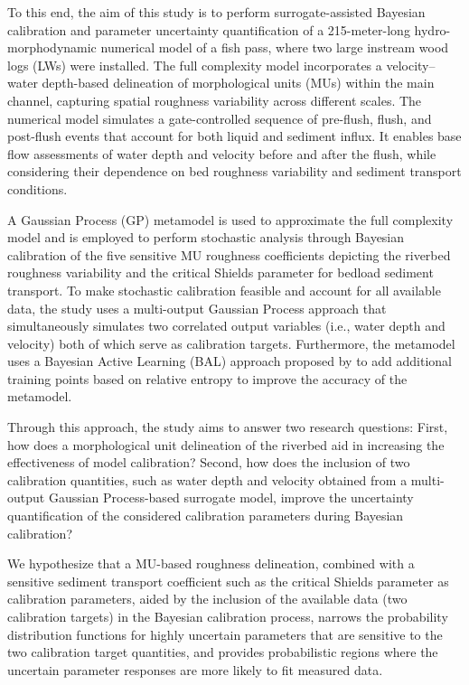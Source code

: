 \documentclass[draft,linenumbers,onecolumn]{agujournal2019} %
\begin{document}
% 
To this end, the aim of this study is to perform surrogate-assisted Bayesian calibration and parameter uncertainty quantification of a 215-meter-long hydro-morphodynamic numerical model of a fish pass, where two large instream wood logs (LWs) were installed. The full complexity model incorporates a velocity–water depth-based delineation of morphological units (MUs) within the main channel, capturing spatial roughness variability across different scales. The numerical model simulates a gate-controlled sequence of pre-flush, flush, and post-flush events that account for both liquid and sediment influx. It enables base flow assessments of water depth and velocity before and after the flush, while considering their dependence on bed roughness variability and sediment transport conditions.

A Gaussian Process (GP) metamodel is used to approximate the full complexity model and is employed to perform stochastic analysis through Bayesian calibration of the five sensitive MU roughness coefficients depicting the riverbed roughness variability and the critical Shields parameter for bedload sediment transport. To make stochastic calibration feasible and account for all available data, the study uses a multi-output Gaussian Process approach that simultaneously simulates two correlated output variables (i.e., water depth and velocity) both of which serve as calibration targets. Furthermore, the metamodel uses a Bayesian Active Learning (BAL) approach proposed by  to add additional training points based on relative entropy to improve the accuracy of the metamodel. 

Through this approach, the study aims to answer two research questions: First, how does a morphological unit delineation of the riverbed aid in increasing the effectiveness of model calibration? Second, how does the inclusion of two calibration quantities, such as water depth and velocity obtained from a multi-output Gaussian Process-based surrogate model, improve the uncertainty quantification of the considered calibration parameters during Bayesian calibration?

We hypothesize that a MU-based roughness delineation, combined with a sensitive sediment transport coefficient such as the critical Shields parameter as calibration parameters, aided by the inclusion of the available data (two calibration targets) in the Bayesian calibration process, narrows the probability distribution functions for highly uncertain parameters that are sensitive to the two calibration target quantities, and provides probabilistic regions where the uncertain parameter responses are more likely to fit measured data.  
\end{document}
